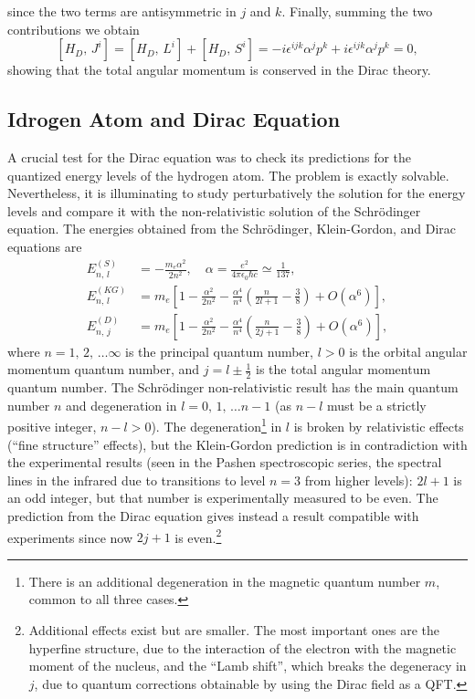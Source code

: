 since the two terms are antisymmetric in \(j\) and \(k\). Finally, summing the two contributions we obtain
\[
    \left[H_D,\, J^i\right] = \left[H_D,\, L^i\right] + \left[H_D,\, S^i\right] = -i \epsilon^{ijk} \alpha^j p^k + i \epsilon^{ijk} \alpha^j p^k = 0,
\]
showing that the total angular momentum is conserved in the Dirac theory.

\subsection{Idrogen Atom and Dirac Equation}

A crucial test for the Dirac equation was to check its predictions for the quantized energy levels of the hydrogen atom. The problem is exactly solvable. Nevertheless, it is illuminating to study perturbatively the solution for the energy levels and compare it with the non-relativistic solution of the Schrödinger equation. The energies obtained from the Schrödinger, Klein-Gordon, and Dirac equations are
\[
    \begin{aligned}
        E^{(S)}_{n,\,l}  & = - \frac{m_e \alpha^2}{2 n^2}, \quad \alpha = \frac{e^2}{4 \pi \epsilon_0 \hbar c} \simeq \frac{1}{137},                       \\
        E^{(KG)}_{n,\,l} & = m_e \left[1 - \frac{\alpha^2}{2n^2} - \frac{\alpha^4}{n^4} \left( \frac{n}{2l + 1} -\frac{3}{8} \right) + O(\alpha^6)\right], \\
        E^{(D)}_{n,\,j}  & = m_e \left[1 - \frac{\alpha^2}{2n^2} - \frac{\alpha^4}{n^4} \left( \frac{n}{2j + 1} -\frac{3}{8} \right) + O(\alpha^6)\right],
    \end{aligned}
\]
where \(n = 1,\,2,\,\dots \infty\) is the principal quantum number, \(l>0\) is the orbital angular momentum quantum number, and \(j = l \pm \tfrac{1}{2}\) is the total angular momentum quantum number. The Schrödinger non-relativistic result has the main quantum number \(n\) and degeneration in \(l = 0,\,1,\,\dots n-1\) (as \(n-l\) must be a strictly positive integer, \(n-l > 0\)). The degeneration\footnote{There is an additional degeneration in the magnetic quantum number \(m\), common to all three cases.} in \(l\) is broken by relativistic effects (“fine structure” effects), but the Klein-Gordon prediction is in contradiction with the experimental results (seen in the Pashen spectroscopic series, the spectral lines in the infrared due to transitions to level \(n=3\) from higher levels): \(2l + 1\) is an odd integer, but that number is experimentally measured to be even. The prediction from the Dirac equation gives instead a result compatible with experiments since now \(2j + 1\) is even.\footnote{Additional effects exist but are smaller. The most important ones are the hyperfine structure, due to the interaction of the electron with the magnetic moment of the nucleus, and the “Lamb shift”, which breaks the degeneracy in \(j\), due to quantum corrections obtainable by using the Dirac field as a QFT.}

